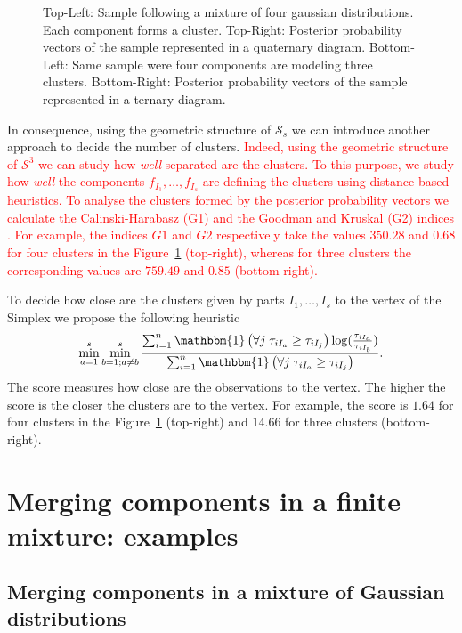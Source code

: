 \documentclass[submit]{smj}
\theoremstyle{definition}
\begin{document}
\begin{figure}[thbp]
\begin{center}
\begin{tabular}{cc}
 \end{tabular}
 \caption{Top-Left: Sample following a mixture of four gaussian distributions. Each component forms a cluster. Top-Right: Posterior probability vectors of the sample represented in a quaternary diagram. Bottom-Left: Same sample were four components are modeling three clusters. Bottom-Right: Posterior probability vectors of the sample represented in a ternary diagram.}\label{cluster_post}
\end{center}
\end{figure}

In consequence, using the geometric structure of $\mathcal{S}_s$  we can introduce another approach to decide the number of clusters. \textcolor{red}{Indeed, using the geometric structure of $\mathcal{S}^3$ we can study how \emph{well} separated are the clusters. To this purpose, we study how \emph{well} the components $f_{I_1}, \dots, f_{I_s}$ are defining the clusters using distance based heuristics. To analyse the clusters formed by the posterior probability vectors we calculate the Calinski-Harabasz (G1) and the Goodman and Kruskal (G2) indices \citep{milligan1985}. For example, the indices $G1$ and $G2$ respectively take the values $350.28$ and $0.68$ for four clusters in the Figure~\ref{cluster_post} (top-right), whereas for three clusters the corresponding values are $759.49$ and $0.85$ (bottom-right).}

To decide how close are the clusters given by parts $I_1,\dots, I_s$ to the vertex of the Simplex we propose the following heuristic
\[
\min_{a=1}^s \min_{b=1;a\neq b}^s \frac{ \sum_{i=1}^n  \mathbbm{1}\left( \forall j\; \tau_{i I_{a}} \geq \tau_{iI_j} \right) \log(\frac{\tau_{iI_a}}{\tau_{iI_b}}) }{\sum_{i=1}^n\mathbbm{1}\left( \forall j\; \tau_{i I_{a}} \geq \tau_{iI_j} \right) }.
\]
The score measures how close are the observations to the vertex. The higher the score  is  the closer the clusters are to the vertex. For example, the score is $1.64$ for four clusters in the Figure~\ref{cluster_post} (top-right) and $14.66$ for three clusters (bottom-right).




\section{Merging components in a finite mixture: examples}\label{merging_examples_dist}

\subsection{Merging components in a mixture of Gaussian distributions}
\end{document}

